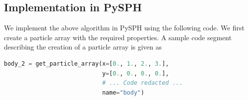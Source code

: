 \subsection{Implementation in PySPH}
We implement the above algorithm in PySPH using the following code. We first
create a particle array with the required properties. A sample code segment
describing the creation of a particle array is given as
 \lstset{basicstyle=\footnotesize\ttfamily}
\begin{lstlisting}[label={contact:equations},frame=lines,language=Python,upquote=True]
body_2 = get_particle_array(x=[0., 1., 2., 3.],
                            y=[0., 0., 0., 0.],
                            # ... Code redacted ...
                            name="body")
\end{lstlisting}

